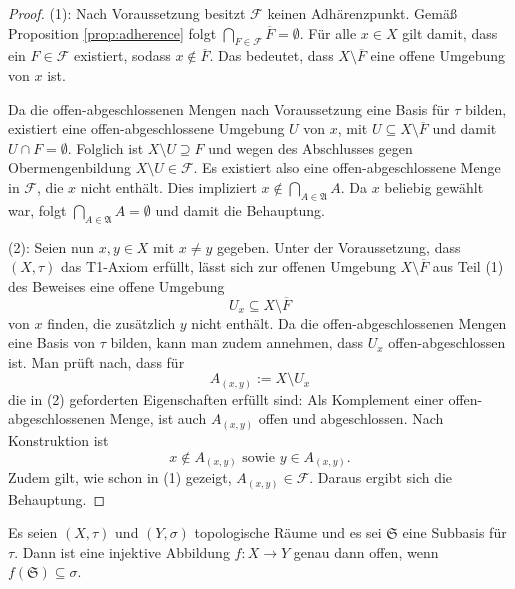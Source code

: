 \begin{proof}
  (1):
  Nach Voraussetzung besitzt $\mathcal{F}$ keinen Adhärenzpunkt.
  Gemäß Proposition \ref{prop:adherence} folgt $\bigcap_{F \in \mathcal{F}} \overline F = \emptyset$.
  Für alle $x \in X$ gilt damit, dass ein $F \in \mathcal{F}$ existiert, sodass $x \not\in \overline{F}$.
  Das bedeutet, dass $X \setminus \overline{F}$ eine offene Umgebung von $x$ ist.

  Da die offen\hyp{}abgeschlossenen Mengen nach Voraussetzung eine Basis für $\tau$ bilden, existiert eine offen\hyp{}abgeschlossene Umgebung $U$ von $x$, mit $U \subseteq X \setminus \overline{F}$ und damit $ U \cap F = \emptyset$.
  Folglich ist $X \setminus U \supseteq F$ und wegen des Abschlusses gegen Obermengenbildung $X \setminus U \in \mathcal{F}$.
  Es existiert also eine offen\hyp{}abgeschlossene Menge in $\mathcal{F}$, die $x$ nicht enthält. 
  Dies impliziert $ x \not\in \bigcap_{A \in \mathfrak{A}} A$.
  Da $x$ beliebig gewählt war, folgt $\bigcap_{A \in \mathfrak{A}} A = \emptyset$ und damit die Behauptung.

  (2):
  Seien nun $x,y \in X$ mit $x \neq y$ gegeben.
  Unter der Voraussetzung, dass $(X,\tau)$ das T1\hyp{}Axiom erfüllt, lässt sich zur offenen Umgebung $X \setminus \overline{F}$ aus Teil (1) des Beweises eine offene Umgebung 
  \begin{displaymath}
    U_x \subseteq X \setminus \overline{F}
  \end{displaymath}
  von $x$ finden, die zusätzlich $y$ nicht enthält. 
  Da die offen\hyp{}abgeschlossenen Mengen eine Basis von $\tau$ bilden, kann man zudem annehmen, dass $U_x$ offen\hyp{}abgeschlossen ist.
  Man prüft nach, dass für
  \begin{displaymath}
    A_{(x,y)} := X \setminus U_x
  \end{displaymath}
  die in (2) geforderten Eigenschaften erfüllt sind:
  Als Komplement einer offen\hyp{}abgeschlossenen Menge, ist auch $A_{(x,y)}$ offen und abgeschlossen.
  Nach Konstruktion ist 
  \begin{displaymath}
    x \not\in A_{(x,y)} \text{ sowie } y \in A_{(x,y)}.
  \end{displaymath}
  Zudem gilt, wie schon in (1) gezeigt, $A_{(x,y)} \in \mathcal{F}$.
  Daraus ergibt sich die Behauptung. \qedhere
\end{proof}

\begin{lem}
  \label{lem:openmap}
  Es seien $(X,\tau)$ und $(Y,\sigma)$ topologische Räume und es sei $\mathfrak{S}$ eine Subbasis für $\tau$.  
  Dann ist eine injektive Abbildung $f \colon X \to Y$ genau dann offen, wenn $f(\mathfrak{S}) \subseteq \sigma$.
\end{lem}

